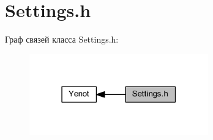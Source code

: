\hypertarget{group__settingsh}{}\section{Settings.\+h}
\label{group__settingsh}
Граф связей класса Settings.\+h\+:
\nopagebreak
\begin{figure}[H]
\begin{center}
\leavevmode
\includegraphics[width=219pt]{group__settingsh}
\end{center}
\end{figure}
